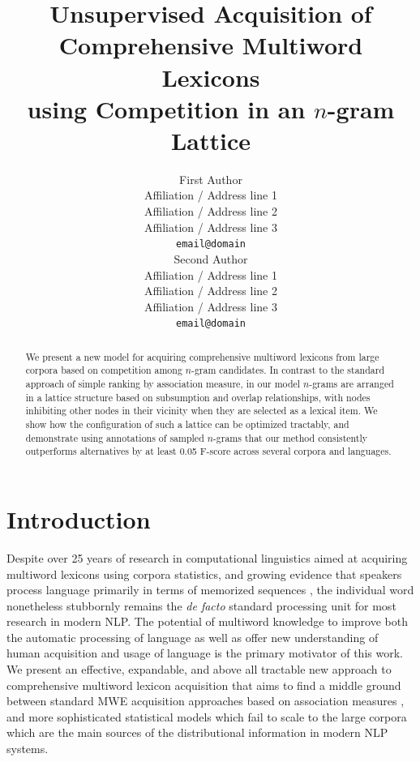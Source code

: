 \documentclass[11pt,letterpaper]{article}
\title{Unsupervised Acquisition of Comprehensive Multiword Lexicons \\ using Competition in an $n$-gram Lattice}
\author{First Author \\
  Affiliation / Address line 1 \\
  Affiliation / Address line 2 \\
  Affiliation / Address line 3 \\
  {\tt email@domain} \\\And
  Second Author \\
  Affiliation / Address line 1 \\
  Affiliation / Address line 2 \\
  Affiliation / Address line 3 \\
  {\tt email@domain} \\}
\date{}
\begin{document}
\maketitle


\begin{abstract}
We present a new model for acquiring comprehensive multiword lexicons from large corpora based on  competition among $n$-gram candidates. In contrast to the standard approach of simple ranking by association measure, in our model $n$-grams are arranged in a lattice structure based on subsumption and overlap relationships, with nodes inhibiting other nodes in their vicinity when they are selected as a lexical item. We show how the configuration of such a lattice can be optimized tractably, and demonstrate using annotations of sampled $n$-grams that our method consistently outperforms alternatives by at least 0.05 F-score across several corpora and languages.
\end{abstract}


\section{Introduction}

Despite over 25 years of research in computational linguistics aimed at acquiring multiword lexicons using corpora statistics, and growing evidence that speakers process language primarily in terms of memorized sequences \cite{Wray08}, the individual word nonetheless stubbornly remains the \textit{de facto} standard processing unit for most research in modern NLP. The potential of multiword knowledge to improve both the automatic processing of language as well as offer new understanding of human acquisition and usage of language is the primary motivator of this work. We present an effective, expandable, and above all tractable new approach to comprehensive multiword lexicon acquisition that aims to find a middle ground between standard MWE acquisition approaches based on association measures \cite{Ramisch14}, and more sophisticated statistical models \cite{Newman12} which fail to scale to the large corpora which are the main sources of the distributional information in modern NLP systems.


\end{document}
